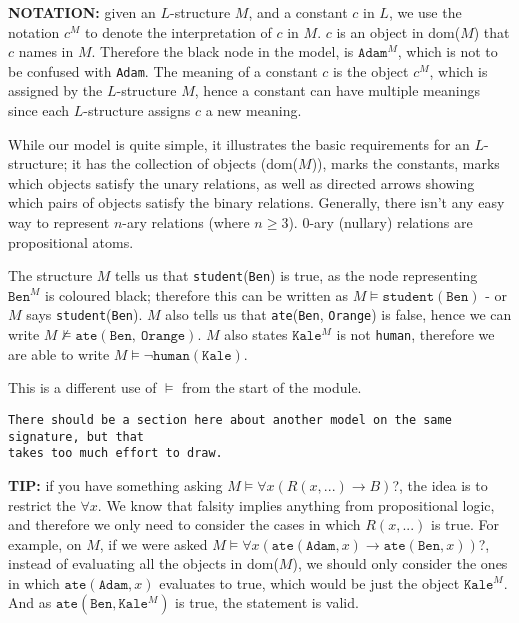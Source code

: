 \documentclass[a4paper, 12pt]{article}
\begin{document}
                \textbf{NOTATION:} given an $L$-structure $M$, and a constant $c$ in $L$, we use the notation $c^M$ to denote the interpretation of $c$ in $M$. $c$ is an object in dom($M$) that $c$ names in $M$. Therefore the black node in the model, is $\texttt{Adam}^M$, which is not to be confused with \texttt{Adam}. The meaning of a constant $c$ is the object $c^M$, which is assigned by the $L$-structure $M$, hence a constant can have multiple meanings since each $L$-structure assigns $c$ a new meaning.
                \medskip

                While our model is quite simple, it illustrates the basic requirements for an $L$-structure; it has the collection of objects (dom($M$)), marks the constants, marks which objects satisfy the unary relations, as well as directed arrows showing which pairs of objects satisfy the binary relations. Generally, there isn't any easy way to represent $n$-ary relations (where $n \geq 3$). 0-ary (nullary) relations are propositional atoms.
                \medskip

                The structure $M$ tells us that \texttt{student}(\texttt{Ben}) is true, as the node representing $\texttt{Ben}^M$ is coloured black; therefore this can be written as $M \vDash \texttt{student}(\texttt{Ben})$ - or $M$ says \texttt{student}(\texttt{Ben}). $M$ also tells us that \texttt{ate}(\texttt{Ben}, \texttt{Orange}) is false, hence we can write $M \nvDash \texttt{ate}(\texttt{Ben},\ \texttt{Orange})$. $M$ also states $\texttt{Kale}^M$ is not \texttt{human}, therefore we are able to write $M \vDash \neg \texttt{human}(\texttt{Kale})$.
                \medskip

                This is a different use of $\vDash$ from the start of the module.
                \medskip

                \texttt{There should be a section here about another model on the same signature, but that \\ takes too much effort to draw.}
                \medskip

                \textbf{TIP:} if you have something asking $M \vDash \forall x (R(x, ...) \rightarrow B)$?, the idea is to restrict the $\forall x$. We know that falsity implies anything from propositional logic, and therefore we only need to consider the cases in which $R(x, ...)$ is true. For example, on $M$, if we were asked $M \vDash \forall x (\texttt{ate}(\texttt{Adam}, x) \rightarrow \texttt{ate}(\texttt{Ben}, x))$?, instead of evaluating all the objects in dom($M$), we should only consider the ones in which $\texttt{ate}(\texttt{Adam}, x)$ evaluates to true, which would be just the object $\texttt{Kale}^M$. And as $\texttt{ate}(\texttt{Ben}, \texttt{Kale}^M)$ is true, the statement is valid.
                \medskip
\end{document}
